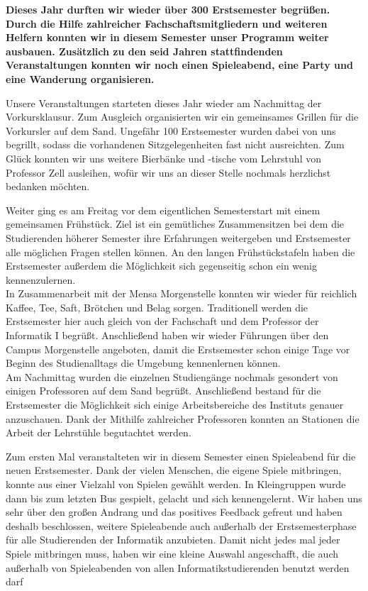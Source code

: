 \textbf{Dieses Jahr durften wir wieder über 300 Erstsemester begrüßen. Durch die Hilfe zahlreicher Fachschaftsmitgliedern und weiteren Helfern konnten wir in diesem Semester unser Programm weiter ausbauen. Zusätzlich zu den seid Jahren stattfindenden Veranstaltungen konnten wir noch einen Spieleabend, eine Party und eine Wanderung organisieren.}
%

Unsere Veranstaltungen starteten dieses Jahr wieder am Nachmittag der Vorkursklausur. Zum Ausgleich organisierten wir ein gemeinsames Grillen für die Vorkursler auf dem Sand. Ungefähr 100 Erstsemester wurden dabei von uns begrillt, sodass die vorhandenen Sitzgelegenheiten fast nicht ausreichten. Zum Glück konnten wir uns weitere Bierbänke und -tische vom Lehrstuhl von Professor Zell ausleihen, wofür wir uns an dieser Stelle nochmals herzlichst bedanken möchten.

Weiter ging es am Freitag vor dem eigentlichen Semesterstart mit einem gemeinsamen Frühstück. Ziel ist ein gemütliches Zusammensitzen bei dem die Studierenden höherer Semester ihre Erfahrungen weitergeben und Erstsemester alle möglichen Fragen stellen können. An den langen Frühstückstafeln haben die Erstsemester außerdem die Möglichkeit sich gegenseitig schon ein wenig kennenzulernen.\\
In Zusammenarbeit mit der Mensa Morgenstelle konnten wir wieder für reichlich Kaffee, Tee, Saft, Brötchen und Belag sorgen. Traditionell werden die Erstsemester hier auch gleich von der Fachschaft und dem Professor der Informatik I begrüßt. Anschließend haben wir wieder Führungen über den Campus Morgenstelle angeboten, damit die Erstsemester schon einige Tage vor Beginn des Studienalltags die Umgebung kennenlernen können.\\
Am Nachmittag wurden die einzelnen Studiengänge nochmals gesondert von einigen Professoren auf dem Sand begrüßt. Anschließend bestand für die Erstsemester die Möglichkeit sich einige Arbeitsbereiche des Instituts genauer anzuschauen. Dank der Mithilfe zahlreicher Professoren konnten an  Stationen die Arbeit der Lehrstühle begutachtet werden.
%
%
%

Zum ersten Mal veranstalteten wir in diesem Semester einen Spieleabend für die neuen Erstsemester. Dank der vielen Menschen, die eigene Spiele mitbringen, konnte aus einer Vielzahl von Spielen gewählt werden. In Kleingruppen wurde dann bis zum letzten Bus gespielt, gelacht und sich kennengelernt. Wir haben uns sehr über den großen Andrang und das positives Feedback gefreut und haben deshalb beschlossen, weitere Spieleabende auch außerhalb der Erstsemesterphase für alle Studierenden der Informatik anzubieten. Damit nicht jedes mal jeder Spiele mitbringen muss, haben wir eine kleine Auswahl angeschafft, die auch außerhalb von Spieleabenden von allen Informatikstudierenden benutzt werden darf

